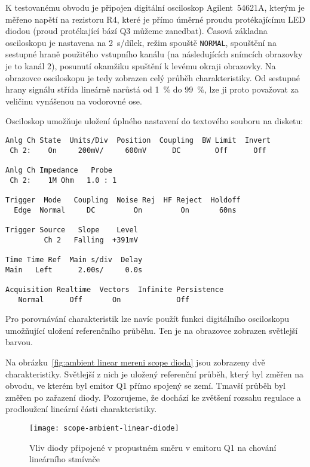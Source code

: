 K testovanému obvodu je připojen digitální osciloskop Agilent~54621A, kterým je
měřeno napětí na rezistoru R4, které je přímo úměrné proudu protékajícímu LED
diodou (proud protékající bází Q3 můžeme zanedbat). Časová základna osciloskopu
je nastavena na \SI{2}{\second}/dílek, režim spouště \texttt{NORMAL}, spouštění
na sestupné hraně použitého vstupního kanálu (na následujících snímcích
obrazovky je to kanál 2), posunutí okamžiku spuštění k levému okraji obrazovky.
Na obrazovce osciloskopu je tedy zobrazen celý průběh charakteristiky. Od
sestupné hrany signálu střída lineárně narůstá od \SI{1}{\percent} do
\SI{99}{\percent}, lze ji proto považovat za veličinu vynášenou na vodorovné
ose.

Osciloskop umožňuje uložení úplného nastavení do textového souboru na disketu:
\begin{lstlisting}[style=terminal]
Anlg Ch State  Units/Div  Position  Coupling  BW Limit  Invert
 Ch 2:    On     200mV/     600mV      DC        Off      Off

Anlg Ch Impedance   Probe
 Ch 2:    1M Ohm   1.0 : 1

Trigger  Mode   Coupling  Noise Rej  HF Reject  Holdoff
  Edge  Normal     DC         On         On       60ns

Trigger Source   Slope    Level
         Ch 2   Falling  +391mV

Time Time Ref  Main s/div  Delay
Main   Left      2.00s/     0.0s

Acquisition Realtime  Vectors  Infinite Persistence
   Normal      Off       On             Off
\end{lstlisting}

Pro porovnávání charakteristik lze navíc použít funkci digitálního osciloskopu
umožňující uložení referenčního průběhu. Ten je na obrazovce zobrazen světlejší
barvou.

Na obrázku~\vref{fig:ambient linear mereni scope dioda} jsou zobrazeny dvě
charakteristiky. Světlejší z nich je uložený referenční průběh, který byl
změřen na obvodu, ve kterém byl emitor Q1 přímo spojený se zemí. Tmavší průběh
byl změřen po zařazení diody. Pozorujeme, že dochází ke zvětšení rozsahu
regulace a prodloužení lineární části charakteristiky.

\begin{figure}[htbp]
    \centering
    \texttt{[image: scope-ambient-linear-diode]}
    \caption{%
        Vliv diody připojené v propustném směru v emitoru Q1 na chování
        lineárního stmívače
    }
    \label{fig:ambient linear mereni scope dioda}
\end{figure}


